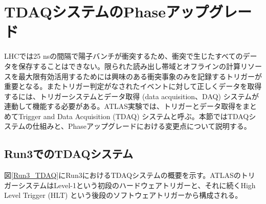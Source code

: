 \section{TDAQシステムのPhase\two アップグレード}
\label{sec_TDAQ}
    LHCでは25 nsの間隔で陽子バンチが衝突するため、衝突で生じたすべてのデータを保存することはできない。限られた読み出し帯域とオフラインの計算リソースを最大限有効活用するためには興味のある衝突事象のみを記録するトリガーが重要となる。またトリガー判定がなされたイベントに対して正しくデータを取得するには、トリガーシステムとデータ取得 (data acquisition、DAQ) システムが連動して機能する必要がある。ATLAS実験では、トリガーとデータ取得をまとめてTrigger and Data Acquisition (TDAQ) システムと呼ぶ。本節ではTDAQシステムの仕組みと、Phase\two アップグレードにおける変更点について説明する。
   
    \subsection{Run3でのTDAQシステム}
    \label{subsec_run3TDAQ}
    図\ref{Run3_TDAQ}にRun3におけるTDAQシステムの概要を示す。ATLASのトリガーシステムはLevel-1という初段のハードウェアトリガーと、それに続くHigh Level Trigger (HLT) という後段のソフトウェアトリガーから構成される。

